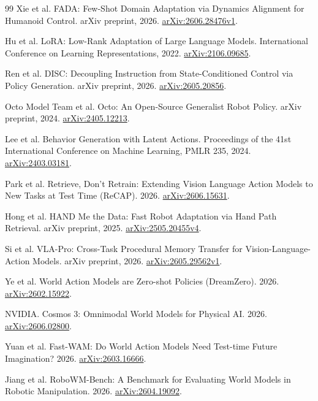 \documentclass[11pt,a4paper]{article}
\begin{document}
\begin{thebibliography}{99}
Xie et al. FADA: Few-Shot Domain Adaptation via Dynamics Alignment for Humanoid Control. arXiv preprint, 2026. \href{https://arxiv.org/abs/2606.28476v1}{arXiv:2606.28476v1}.

Hu et al. LoRA: Low-Rank Adaptation of Large Language Models. International Conference on Learning Representations, 2022. \href{https://arxiv.org/abs/2106.09685}{arXiv:2106.09685}.

Ren et al. DISC: Decoupling Instruction from State-Conditioned Control via Policy Generation. arXiv preprint, 2026. \href{https://arxiv.org/abs/2605.20856}{arXiv:2605.20856}.

Octo Model Team et al. Octo: An Open-Source Generalist Robot Policy. arXiv preprint, 2024. \href{https://arxiv.org/abs/2405.12213}{arXiv:2405.12213}.

Lee et al. Behavior Generation with Latent Actions. Proceedings of the 41st International Conference on Machine Learning, PMLR 235, 2024. \href{https://arxiv.org/abs/2403.03181}{arXiv:2403.03181}.

Park et al. Retrieve, Don't Retrain: Extending Vision Language Action Models to New Tasks at Test Time (ReCAP). 2026. \href{https://arxiv.org/abs/2606.15631}{arXiv:2606.15631}.

Hong et al. HAND Me the Data: Fast Robot Adaptation via Hand Path Retrieval. arXiv preprint, 2025. \href{https://arxiv.org/abs/2505.20455v4}{arXiv:2505.20455v4}.

Si et al. VLA-Pro: Cross-Task Procedural Memory Transfer for Vision-Language-Action Models. arXiv preprint, 2026. \href{https://arxiv.org/abs/2605.29562v1}{arXiv:2605.29562v1}.

Ye et al. World Action Models are Zero-shot Policies (DreamZero). 2026. \href{https://arxiv.org/abs/2602.15922}{arXiv:2602.15922}.

NVIDIA. Cosmos 3: Omnimodal World Models for Physical AI. 2026. \href{https://arxiv.org/abs/2606.02800}{arXiv:2606.02800}.

Yuan et al. Fast-WAM: Do World Action Models Need Test-time Future Imagination? 2026. \href{https://arxiv.org/abs/2603.16666}{arXiv:2603.16666}.

Jiang et al. RoboWM-Bench: A Benchmark for Evaluating World Models in Robotic Manipulation. 2026. \href{https://arxiv.org/abs/2604.19092}{arXiv:2604.19092}.


\end{thebibliography}
\end{document}
